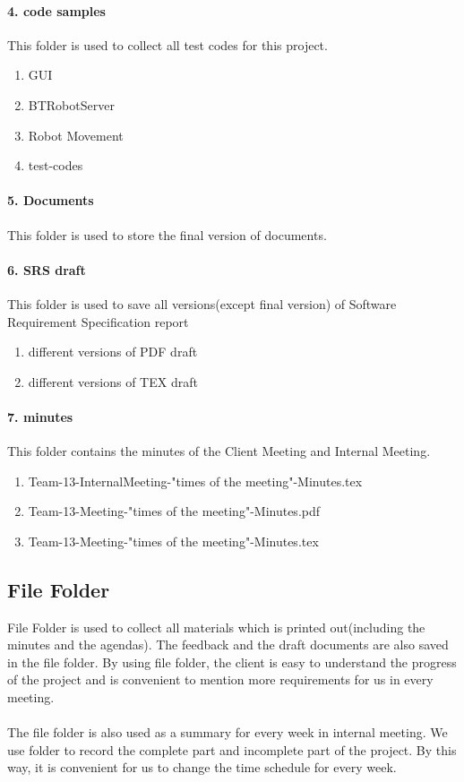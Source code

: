 \documentclass[11pt, a4paper]{report}
\begin{document}
\paragraph{4. code samples}
This folder is used to collect all test codes for this project.

\begin{enumerate}
	\item GUI
	\item BTRobotServer
	\item Robot Movement
	\item test-codes
\end{enumerate}

\paragraph{5. Documents}
This folder is used to store the final version of documents.
\paragraph{6. SRS draft}
This folder is used to save all versions(except final version) of Software Requirement Specification report 

\begin{enumerate}
	\item different versions of PDF draft
 	\item different versions of TEX draft 
\end{enumerate}

\paragraph{7. minutes}
This folder contains the minutes of the Client Meeting and Internal Meeting.
\begin{enumerate}
	\item Team-13-InternalMeeting-"times of the meeting"-Minutes.tex
	\item Team-13-Meeting-"times of the meeting"-Minutes.pdf
	\item Team-13-Meeting-"times of the meeting"-Minutes.tex
\end{enumerate}
\subsection{File Folder}
File Folder is used to collect all materials which is printed out(including the minutes and the agendas). The feedback and the draft documents are also saved in the file folder. By using file folder, the client is easy to understand the progress of the project and is convenient to mention more requirements for us in every meeting.\\ \\
The file folder is also used as a summary for every week in internal meeting. We use folder to record the complete part and incomplete part of the project. By this way, it is convenient for us to change the time schedule for every week.   
\end{document}
